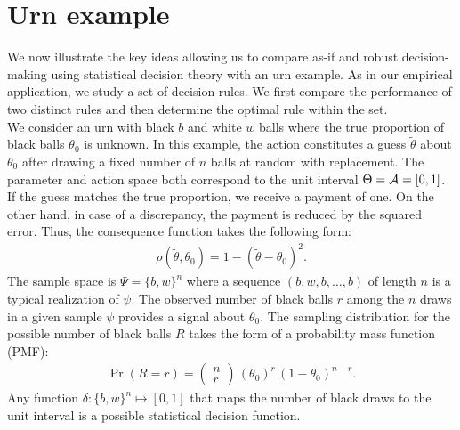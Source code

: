 \section{Urn example}
We now illustrate the key ideas allowing us to compare as-if and robust decision-making using statistical decision theory with an urn example. As in our empirical application, we study a set of decision rules. We first compare the performance of two distinct rules and then determine the optimal rule within the set.\\

We consider an urn with black $b$ and white $w$ balls where the true proportion of black balls $\theta_0$ is unknown. In this example, the action constitutes a guess $\tilde{\theta}$ about $\theta_0$ after drawing a fixed number of $n$ balls at random with replacement. The parameter and action space both correspond to the unit interval $\Theta = \mathcal{A} = [0, 1]$. \\

If the guess matches the true proportion, we receive a payment of one. On the other hand, in case of a discrepancy, the payment is reduced by the squared error. Thus, the consequence function takes the following form:
%
\begin{align*}
\rho(\tilde{\theta}, \theta_0) = 1 - (\tilde{\theta} - \theta_0)^2.
\end{align*}
%
The sample space is $\Psi = \{b, w\}^n$ where a sequence $(b, w, b, \hdots, b)$ of length $n$ is a typical realization of $\psi$. The observed number of black balls $r$ among the $n$ draws in a given sample $\psi$ provides a signal about $\theta_0$. The sampling distribution for the possible number of black balls $R$ takes the form of a probability mass function (PMF):
%
\begin{align*}
\Pr(R = r) = \left(\begin{array}{c} n \\ r \end{array} \right)\, (\theta_0)^r\, (1 - \theta_0)^{n-r}.
\end{align*}
%
Any function $\delta:  \{b, w\}^n \mapsto [0, 1]$ that maps the number of black draws to the unit interval is a possible statistical decision function.\\

